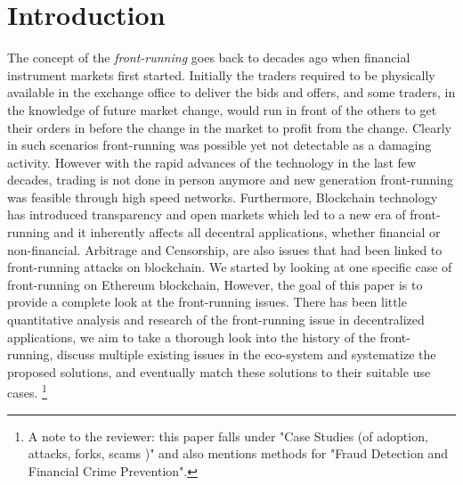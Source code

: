 \section{Introduction}



The concept of the \emph{front-running} goes back to decades ago when financial instrument markets first started. Initially the traders required to be physically available in the exchange office to deliver the bids and offers, and some traders, in the knowledge of future market change, would run in front of the others to get their orders in before the change in the market to profit from the change. Clearly in such scenarios front-running was possible yet not detectable as a damaging activity. However with the rapid advances of the technology in the last few decades, trading is not done in person anymore and new generation front-running was feasible through high speed networks. Furthermore, Blockchain technology has introduced transparency and open markets which led to a new era of front-running and it inherently affects all decentral applications, whether financial or non-financial. Arbitrage and Censorship, are also issues that had been linked to front-running attacks on blockchain. We started by looking at one specific case of front-running on Ethereum blockchain, However, the goal of this paper is to provide a complete look at the front-running issues. %
There has been little quantitative analysis and research of the front-running issue in decentralized applications, we aim to take a thorough look into the history of the front-running, discuss multiple existing issues in the eco-system and systematize the proposed solutions, and eventually match these solutions to their suitable use cases. \footnote{A note to the reviewer: this paper falls under "Case Studies (\eg of adoption, attacks, forks, scams \etc)" and also mentions methods for "Fraud Detection and Financial Crime Prevention". }



